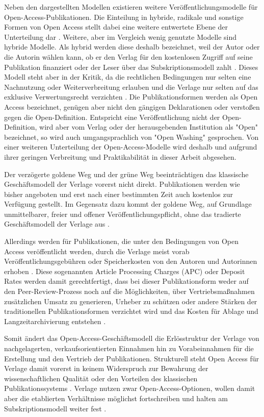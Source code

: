 Neben den dargestellten Modellen existieren weitere Veröffentlichungsmodelle für Open-Access-Publikationen. Die Einteilung in hybride, radikale und sonstige Formen von Open Access stellt dabei eine weitere entwertete Ebene der Unterteilung dar \cite{Mounce_2015}. Weitere, aber im Vergleich wenig genutzte Modelle sind hybride Modelle. Als hybrid werden diese deshalb bezeichnet, weil der Autor oder die Autorin wählen kann, ob er den Verlag für den kostenlosen Zugriff auf seine Publikation finanziert oder der Leser über das Subskriptionsmodell zahlt \cite{Mueller_2010}. Dieses Modell steht aber in der Kritik, da die rechtlichen Bedingungen nur selten eine Nachnutzung oder Weiterverbreitung erlauben und die Verlage nur selten auf das exklusive Verwertungsrecht verzichten \cite{Mueller_2010}. Die Publikationsformen werden als Open Access bezeichnet, genügen aber nicht den gängigen Deklarationen \cite{BOAI_2012} oder verstoßen gegen die Open-Definition. Entspricht eine Veröffentlichung nicht der Open-Definition, wird aber vom Verlag oder der herausgebenden Institution als "Open" bezeichnet, so wird auch umgangsprachlich von "Open Washing" gesprochen. Von einer weiteren Unterteilung der Open-Access-Modelle wird deshalb und aufgrund ihrer geringen Verbreitung und Praktikabilität in dieser Arbeit abgesehen.

Der verzögerte goldene Weg und der grüne Weg beeinträchtigen das klassische Geschäftsmodell der Verlage vorerst nicht direkt. Publikationen werden wie bisher angeboten und erst nach einer bestimmten Zeit auch kostenlos zur Verfügung gestellt. Im Gegensatz dazu kommt der goldene Weg, auf Grundlage unmittelbarer, freier und offener Veröffentlichungspflicht, ohne das tradierte Geschäftsmodell der Verlage aus \cite{Lewis_2012}.

Allerdings werden für Publikationen, die unter den Bedingungen von Open Access veröffentlicht werden, durch die Verlage meist vorab Veröffentlichungsgebühren oder Speicherkosten von den Autoren und Autorinnen erhoben \cite{Jubb_2011}. Diese sogenannten Article Processing Charges (APC) oder Deposit Rates werden damit gerechtfertigt, dass bei dieser Publikationsform weder auf den Peer-Review-Prozess noch auf die Möglichkeiten, über Vertriebsmaßnahmen zusätzlichen Umsatz zu generieren, Urheber zu schützen oder andere Stärken der traditionellen Publikationsformen verzichtet wird \cite{Albert_2006} \cite{Bargheer_2009} und das Kosten für Ablage und Langzeitarchivierung entstehen \cite{Jubb_2011}.

Somit ändert das Open-Access-Geschäftsmodell die Erlösstruktur der Verlage von nachgelagerten, verkaufsorientierten Einnahmen hin zu Vorabeinnahmen für die Erstellung und den Vertrieb der Publikationen. Strukturell steht Open Access für Verlage damit vorerst in keinem Widerspruch zur Bewahrung der wissenschaftlichen Qualität oder den Vorteilen des klassischen Publikationssystems \cite{Suber_2002}. Verlage nutzen zwar Open-Access-Optionen, wollen damit aber die etablierten Verhältnisse möglichst fortschreiben und halten am Subskriptionsmodell weiter fest \cite{Schmidt_2007}.

